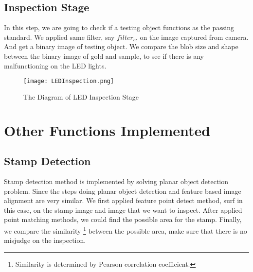 	\subsection{Inspection Stage}
		In this step, we are going to check if a testing object functions as the passing standard.
		We applied same filter, say $filter_c$, on the image captured from camera. And get a binary image of testing object.
		We compare the blob size and shape between the binary image of gold and sample, to see if there is any malfunctioning on the LED lights.
		\begin{figure}
			\texttt{[image: LEDInspection.png]}
			\caption{The Diagram of LED Inspection Stage}
			\label{fig:LEDInspection}
		\end{figure}

\section{Other Functions Implemented}
	\subsection{Stamp Detection}
		Stamp detection method is implemented by solving planar object detection problem.
		Since the steps doing planar object detection and feature based image alignment are very similar.
		We first applied feature point detect method, surf in this case, on the stamp image and image that we want to inspect.
		After applied point matching methods, we could find the possible area for the stamp.
		Finally, we compare the similarity \footnote{\label{fn:simialrity}Similarity is determined by Pearson correlation coefficient.} between the possible area, make sure that there is no misjudge on the inspection.
		